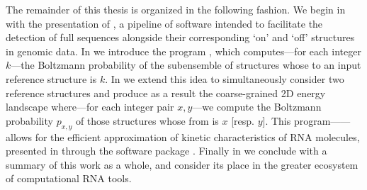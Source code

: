 The remainder of this thesis is organized in the following fashion. We begin in
 with the presentation of \rfinder, a pipeline of
software intended to facilitate the detection of full \rb sequences
alongside their corresponding `on' and `off' structures in genomic data. In
 we introduce the program \fftbor, which computes---for
each integer $k$---the Boltzmann probability \pk of the subensemble of structures
whose \bpd to an input reference structure \str is $k$.
In  we extend this idea to simultaneously consider two
reference structures \strST and produce as a result the coarse-grained 2D energy
landscape where---for each integer pair $x,y$---we compute the Boltzmann
probability $p_{x,y}$
of those structures whose \bpd from  is $x$
[resp. $y$]. This program---\ffttwo---allows for the efficient approximation of
kinetic characteristics of RNA molecules, presented in 
through the software package \hermes. Finally in  we conclude
with a summary of this work as a whole, and consider its place in the greater
ecosystem of computational RNA tools.

